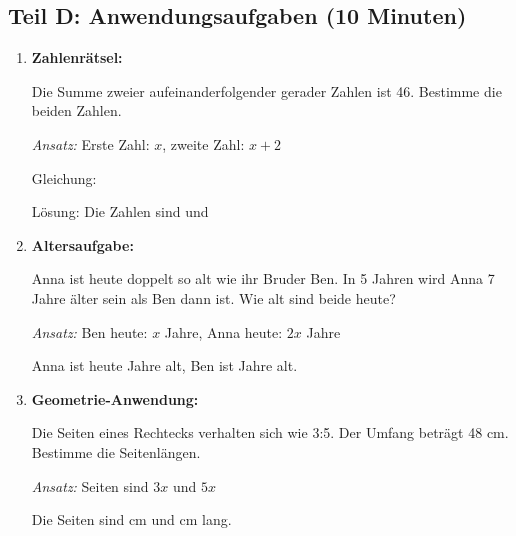 \subsection*{Teil D: Anwendungsaufgaben (10 Minuten)}

\begin{enumerate}[label=\arabic*.,resume]

    \item \textbf{Zahlenrätsel:}

    Die Summe zweier aufeinanderfolgender gerader Zahlen ist 46. Bestimme die beiden Zahlen.

    \textit{Ansatz:} Erste Zahl: $x$, zweite Zahl: $x + 2$

    Gleichung: \underline{\hspace{8cm}}

    Lösung: Die Zahlen sind \underline{\hspace{3cm}} und \underline{\hspace{3cm}}

    \vspace{2cm}

    \item \textbf{Altersaufgabe:}

    Anna ist heute doppelt so alt wie ihr Bruder Ben. In 5 Jahren wird Anna 7 Jahre älter sein als Ben dann ist. Wie alt sind beide heute?

    \textit{Ansatz:} Ben heute: $x$ Jahre, Anna heute: $2x$ Jahre

    \vspace{3cm}

    Anna ist heute \underline{\hspace{3cm}} Jahre alt, Ben ist \underline{\hspace{3cm}} Jahre alt.

    \vspace{1cm}

    \item \textbf{Geometrie-Anwendung:}

    Die Seiten eines Rechtecks verhalten sich wie 3:5. Der Umfang beträgt 48 cm. Bestimme die Seitenlängen.

    \textit{Ansatz:} Seiten sind $3x$ und $5x$

    \vspace{3cm}

    Die Seiten sind \underline{\hspace{3cm}} cm und \underline{\hspace{3cm}} cm lang.

\end{enumerate}
